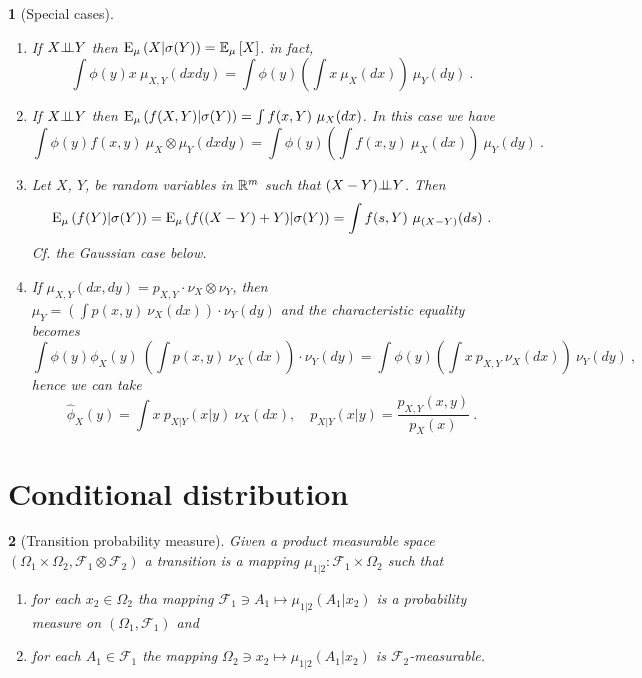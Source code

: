\documentclass[12pt,a4paper]{amsart}
\theoremstyle{plain}%
\newtheorem{npar}{}%
\theoremstyle{definition}
\theoremstyle{remark}
\begin{document}
\begin{npar}[Special cases] \normalfont 
  \begin{enumerate}
  \item If $X{\perp\!\!\!\perp}Y$ then $\operatorname{E}_{\mu}\left(X \middle| \sigma(Y)\right) = \operatorname{\mathbb E}_{\mu}\left[X\right]$. in fact,
    \begin{equation*}
      \int \phi(y)x \ \mu_{X,Y}(dxdy) = \int \phi(y)\left(\int x \ \mu_{X}(dx)\right) \ \mu_{Y}(dy) \ .
    \end{equation*}
  \item If $X{\perp\!\!\!\perp}Y$ then $\operatorname{E}_{\mu}\left(f(X,Y) \middle| \sigma(Y)\right) = \int f(x,Y) \ \mu_X(dx)$. In this case we have
    \begin{equation*}
      \int \phi(y)f(x,y) \ \mu_{X}\otimes\mu_Y(dxdy) = \int \phi(y)\left(\int f(x,y) \ \mu_{X}(dx)\right) \ \mu_{Y}(dy) \ .
    \end{equation*}
\item Let $X$, $Y$, be random variables in $\mathbb{R}^m$ such that $(X-Y){\perp\!\!\!\perp}Y$. Then
  \begin{equation*}
    \condexpat \mu {f(Y)}{\sigma(Y)} = \condexpat \mu {f((X-Y)+Y)}{\sigma(Y)} = \int f(s,Y) \ \mu_{(X-Y)}(ds) \ .
  \end{equation*}
Cf. the Gaussian case below.
  \item If $\mu_{X,Y}(dx,dy) = p_{X,Y} \cdot \nu_X \otimes \nu_Y$, then $\mu_Y = \left(\int p(x,y) \ \nu_X(dx)\right) \cdot \nu_Y(dy)$ and the characteristic equality becomes
    \begin{equation*}
      \int \phi(y) \phi_X(y) \ \left(\int p(x,y) \ \nu_X(dx)\right) \cdot \nu_Y(dy) = \int \phi(y) \left(\int x \ p_{X,Y} \ \nu_X(dx) \right) \ \nu_Y(dy) \ ,
    \end{equation*}
    hence we can take
    \begin{equation*}
      \widehat \phi_X(y) = \int x \ p_{X|Y}(x|y) \ \nu_X(dx), \quad p_{X|Y}(x|y) = \frac {p_{X,Y}(x,y)}{p_X(x)} \ . 
    \end{equation*}
  \end{enumerate}
\end{npar}


\section{Conditional distribution}
\label{sec:cond-distr}

\begin{npar}[Transition probability measure] \normalfont Given a product measurable space $(\Omega_1\times\Omega_2, \mathcal F_1 \otimes \mathcal F_2)$ a \emph{transition} is a mapping $\mu_{1|2} \colon \mathcal F_1 \times \Omega_2$ such that
  \begin{enumerate}
  \item for each $x_2 \in \Omega_2$ tha mapping $\mathcal F_1 \ni A_1 \mapsto \mu_{1|2}(A_1|x_2)$ is a probability measure on $(\Omega_1,\mathcal F_1)$ and
  \item for each $A_1 \in \mathcal F_1$ the mapping $\Omega_2 \ni x_2 \mapsto \mu_{1|2}(A_1|x_2)$ is $\mathcal F_2$-measurable.
  \end{enumerate}
\end{npar}
\end{document}
